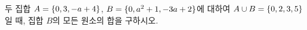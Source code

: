 두 집합 $A=\{0{,}\mkern3mu\mathopen{}3{,}\mkern3mu\mathopen{}-a+4\}$, $B=\{0{,}\mkern3mu\mathopen{}a^2+1{,}\mkern3mu\mathopen{}-3a+2\}$에 대하여 $A\cup B=\{0{,}\mkern3mu\mathopen{}2{,}\mkern3mu\mathopen{}3{,}\mkern3mu\mathopen{}5\}$일 때, 집합 $B$의 모든 원소의 합을 구하시오. 
